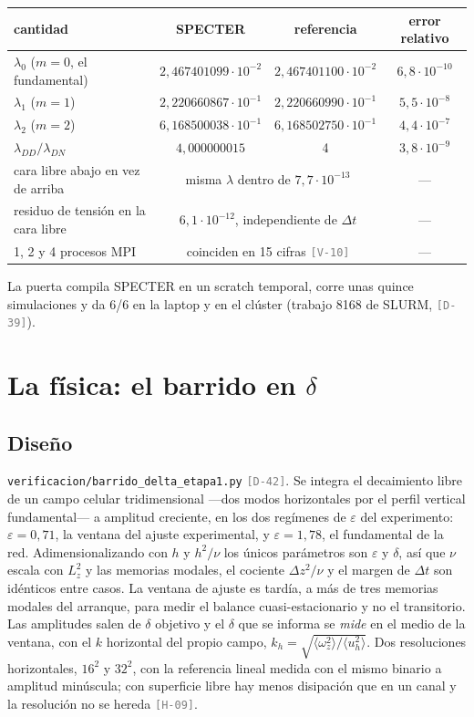 \documentclass[11pt,a4paper]{article}
\newcommand{\avg}[1]{\langle #1\rangle}
\newcommand{\etq}[1]{\textcolor{gray}{\texttt{[#1]}}}
\begin{document}
\begin{center}
\begin{tabular}{lccc}
\toprule
cantidad & SPECTER & referencia & error relativo\\
\midrule
$\lambda_0$ ($m=0$, el fundamental) & $2{,}467401099\cdot10^{-2}$ & $2{,}467401100\cdot10^{-2}$ & $6{,}8\cdot10^{-10}$\\
$\lambda_1$ ($m=1$) & $2{,}220660867\cdot10^{-1}$ & $2{,}220660990\cdot10^{-1}$ & $5{,}5\cdot10^{-8}$\\
$\lambda_2$ ($m=2$) & $6{,}168500038\cdot10^{-1}$ & $6{,}168502750\cdot10^{-1}$ & $4{,}4\cdot10^{-7}$\\
$\lambda_{DD}/\lambda_{DN}$ & $4{,}000000015$ & 4 & $3{,}8\cdot10^{-9}$\\
cara libre abajo en vez de arriba & \multicolumn{2}{c}{misma $\lambda$ dentro de $7{,}7\cdot10^{-13}$} & ---\\
residuo de tensión en la cara libre & \multicolumn{2}{c}{$6{,}1\cdot10^{-12}$, independiente de $\Delta t$} & ---\\
1, 2 y 4 procesos MPI & \multicolumn{2}{c}{coinciden en 15 cifras \etq{V-10}} & ---\\
\bottomrule
\end{tabular}
\end{center}

La puerta compila SPECTER en un scratch temporal, corre unas quince simulaciones y da
6/6 en la laptop y en el clúster (trabajo 8168 de SLURM, \etq{D-39}).

\section{La física: el barrido en $\delta$}
\label{sec:barrido}

\subsection{Diseño}

\texttt{verificacion/barrido\_delta\_etapa1.py} \etq{D-42}. Se integra el decaimiento
libre de un campo celular tridimensional ---dos modos horizontales por el perfil vertical
fundamental--- a amplitud creciente, en los dos regímenes de $\varepsilon$ del
experimento: $\varepsilon=0{,}71$, la ventana del ajuste experimental, y
$\varepsilon=1{,}78$, el fundamental de la red. Adimensionalizando con $h$ y $h^2/\nu$ los
únicos parámetros son $\varepsilon$ y $\delta$, así que $\nu$ escala con $L_z^2$ y las
memorias modales, el cociente $\Delta z^2/\nu$ y el margen de $\Delta t$ son idénticos
entre casos. La ventana de ajuste es tardía, a más de tres memorias modales del arranque,
para medir el balance cuasi-estacionario y no el transitorio. Las amplitudes salen de
$\delta$ objetivo y el $\delta$ que se informa se \emph{mide} en el medio de la ventana,
con el $k$ horizontal del propio campo, $k_h=\sqrt{\avg{\omega_z^2}/\avg{u_h^2}}$. Dos
resoluciones horizontales, $16^2$ y $32^2$, con la referencia lineal medida con el mismo
binario a amplitud minúscula; con superficie libre hay menos disipación que en un canal y
la resolución no se hereda \etq{H-09}.
\end{document}
